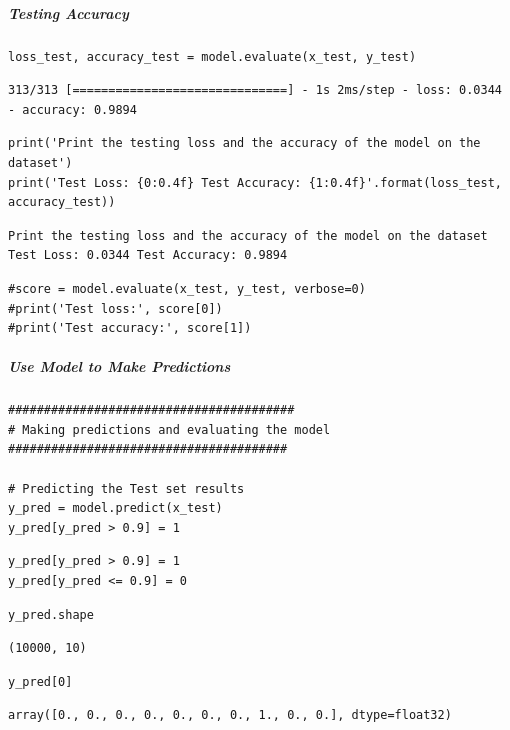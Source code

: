 \subparagraph{Testing Accuracy}

\begin{verbatim}
loss_test, accuracy_test = model.evaluate(x_test, y_test)
\end{verbatim}

\begin{verbatim}
313/313 [==============================] - 1s 2ms/step - loss: 0.0344 - accuracy: 0.9894
\end{verbatim}

\begin{verbatim}
print('Print the testing loss and the accuracy of the model on the dataset')
print('Test Loss: {0:0.4f} Test Accuracy: {1:0.4f}'.format(loss_test, accuracy_test))
\end{verbatim}

\begin{verbatim}
Print the testing loss and the accuracy of the model on the dataset
Test Loss: 0.0344 Test Accuracy: 0.9894
\end{verbatim}

\begin{verbatim}
#score = model.evaluate(x_test, y_test, verbose=0)
#print('Test loss:', score[0])
#print('Test accuracy:', score[1])
\end{verbatim}

\subparagraph{Use Model to Make Predictions}

\begin{verbatim}
########################################
# Making predictions and evaluating the model
#######################################

# Predicting the Test set results
y_pred = model.predict(x_test)
y_pred[y_pred > 0.9] = 1
\end{verbatim}

\begin{verbatim}
y_pred[y_pred > 0.9] = 1
y_pred[y_pred <= 0.9] = 0
\end{verbatim}

\begin{verbatim}
y_pred.shape
\end{verbatim}

\begin{verbatim}
(10000, 10)
\end{verbatim}

\begin{verbatim}
y_pred[0]
\end{verbatim}

\begin{verbatim}
array([0., 0., 0., 0., 0., 0., 0., 1., 0., 0.], dtype=float32)
\end{verbatim}

